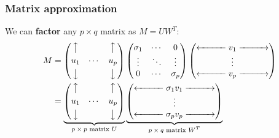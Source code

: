 \documentclass[smaller,handout]{beamer}
\begin{document}
\begin{frame}
\frametitle{Matrix approximation}

We can {\bf factor} any $p \times q$ matrix as $M = UW^T$:
\begin{align*}
M
&= 
\begin{pmatrix}
\big\uparrow    &         & \big\uparrow \\[.05in]
u_1             &  \cdots & u_p  \\[.05in]
\big\downarrow  &         & \big\downarrow
\end{pmatrix}
\begin{pmatrix}
\sigma_1  & \cdots & 0       \\
\vdots    & \ddots & \vdots  \\
0         & \cdots & \sigma_p            
\end{pmatrix}
\begin{pmatrix} 
\xleftarrow{\hspace*{1cm}} v_1 \xrightarrow{\hspace*{1cm}} \\
\vdots \\
\xleftarrow{\hspace*{1cm}} v_p \xrightarrow{\hspace*{1cm}} 
\end{pmatrix} \\
&=
\underbrace{\begin{pmatrix}
\big\uparrow    &         & \big\uparrow \\[.05in]
u_1             &  \cdots & u_p  \\[.05in]
\big\downarrow  &         & \big\downarrow
\end{pmatrix}}_{\text{$p \times p$ matrix $U$}}
\underbrace{\begin{pmatrix} 
\xleftarrow{\hspace*{1cm}} \sigma_1 v_1 \xrightarrow{\hspace*{1cm}} \\
\vdots \\
\xleftarrow{\hspace*{1cm}} \sigma_p v_p \xrightarrow{\hspace*{1cm}} 
\end{pmatrix}}_{\text{$p \times q$ matrix $W^T$}}
\end{align*}


\end{frame}
\end{document}

